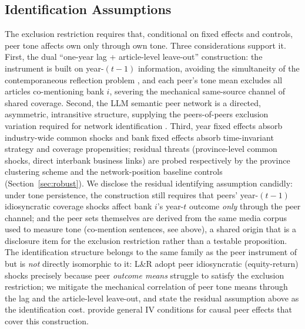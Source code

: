 \subsection{Identification Assumptions}
The exclusion restriction requires that, conditional on fixed effects and controls, peer tone
affects own  only through own tone. Three considerations support it. First, the
dual ``one-year lag + article-level leave-out'' construction: the instrument is built on
year-$(t-1)$ information, avoiding the simultaneity of the contemporaneous reflection problem
\parencite{manski1993reflection}, and each peer's tone mean excludes all articles
co-mentioning bank $i$, severing the mechanical same-source channel of shared coverage.
Second, the LLM semantic peer network is a directed, asymmetric, intransitive structure,
supplying the peers-of-peers exclusion variation required for network identification
\parencite{bramoulle2009networks}. Third, year fixed effects absorb industry-wide common
shocks and bank fixed effects absorb time-invariant strategy and coverage propensities;
residual threats (province-level common shocks, direct interbank business links) are probed
respectively by the province clustering scheme and the network-position baseline controls
(Section~\ref{sec:robust}). We disclose the residual identifying assumption candidly: under
tone persistence, the construction still requires that peers' year-$(t-1)$ idiosyncratic
coverage shocks affect bank $i$'s year-$t$ outcome \emph{only} through the peer channel; and
the peer sets themselves are derived from the same media corpus used to measure tone
(co-mention sentences, see above), a shared origin that is a disclosure item for the
exclusion restriction rather than a testable proposition. The identification structure
belongs to the same family as the peer instrument of \textcite{leary2014peerfirms} but is
\emph{not} directly isomorphic to it: L\&R adopt peer idiosyncratic (equity-return) shocks
precisely because peer \emph{outcome means} struggle to satisfy the exclusion restriction;
we mitigate the mechanical correlation of peer tone means through the lag and the
article-level leave-out, and state the residual assumption above as the identification cost.
\textcite{luo2025causalpeer} provide general IV conditions for causal peer effects that cover
this construction.

